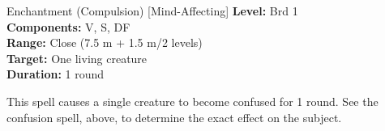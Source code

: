 {Enchantment (Compulsion) [Mind-Affecting]}
{
	\textbf{Level:}
	Brd 1\\
	\textbf{Components:}
	V, S, DF\\
	\textbf{Range:}
	Close (7.5 m + 1.5 m/2 levels)\\
	\textbf{Target:}
	One living creature\\
	\textbf{Duration:}
	1 round\\
}
{
	This spell causes a single creature to become confused for 1 round. See the confusion spell, above, to determine the exact effect on the subject.

}
